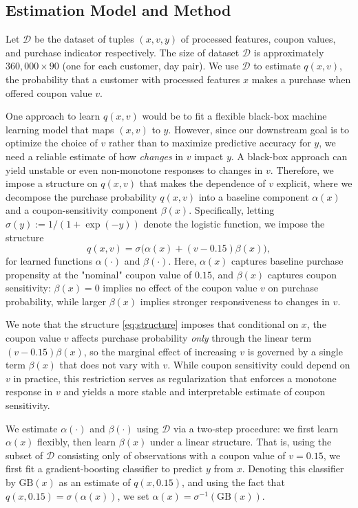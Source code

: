 \documentclass[format=acmsmall, review=false]{acmart}
\begin{document}
\subsection{Estimation Model and Method}

Let $\mathcal D$ be the dataset of tuples $(x, v, y)$ of processed features, coupon values, and purchase indicator respectively.
The size of dataset $\mathcal D$ is approximately $360,000\times 90$ (one for each customer, day pair).
We use $\mathcal D$ to estimate $q(x,v)$, the probability that a customer with processed features $x$ makes a purchase when offered coupon value $v$.

One approach to learn $q(x,v)$ would be to fit a flexible black-box machine learning model that maps $(x, v)$ to $y$. 
However, since our downstream goal is to optimize the choice of $v$ rather than to maximize predictive accuracy for $y$, 
we need a reliable estimate of how \textit{changes} in $v$ impact $y$.
A black-box approach can yield unstable or even non-monotone responses to changes in $v$.
Therefore, we impose a structure on $q(x,v)$ that makes the dependence of $v$ explicit, where we decompose the purchase probability $q(x,v)$ into a baseline component $\alpha(x)$ and a coupon-sensitivity component $\beta(x)$. 
Specifically, letting $\sigma(y):=1/(1+\exp(-y))$ denote the logistic function, we impose the structure
\begin{equation}\label{eq:structure}
q(x,v)=\sigma\!\big(\alpha(x) + (v-0.15)\beta(x)\big),
\end{equation}
for learned functions $\alpha(\cdot)$ and $\beta(\cdot)$.
Here, $\alpha(x)$ captures baseline purchase propensity at the "nominal" coupon value of $0.15$, and $\beta(x)$ captures coupon sensitivity: $\beta(x)=0$ implies no effect of the coupon value $v$ on purchase probability, while larger $\beta(x)$ implies stronger responsiveness to changes in $v$.

We note that the structure \eqref{eq:structure} imposes that conditional on $x$, the coupon value $v$ affects purchase probability \textit{only} through the linear term $(v-0.15)\beta(x)$, so the marginal effect of increasing $v$ is governed by a single term $\beta(x)$ that does not vary with $v$. While coupon sensitivity could depend on $v$ in practice, this restriction serves as regularization that enforces a monotone response in $v$ and yields a more stable and interpretable estimate of coupon sensitivity.

We estimate $\alpha(\cdot)$ and $\beta(\cdot)$ using $\mathcal D$ via a two-step procedure: we first learn $\alpha(x)$ flexibly, then learn $\beta(x)$ under a linear structure.
That is, using the subset of $\mathcal D$ consisting only of observations with a coupon value of $v=0.15$, we first fit a gradient-boosting classifier to predict $y$ from $x$. 
Denoting this classifier by $\mathrm{GB}(x)$ as an estimate of $q(x, 0.15)$, and using the fact that $q(x, 0.15) = \sigma(\alpha(x))$, we set $\alpha(x) = \sigma^{-1}(\mathrm{GB}(x))$.
\end{document}
